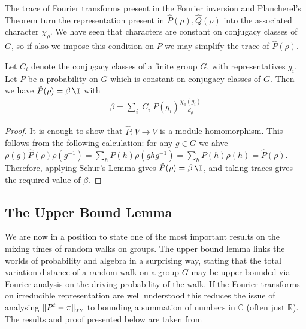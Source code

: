 \documentclass[11pt]{report}
\begin{document}
The trace of Fourier transforms present in the Fourier inversion and Plancherel's Theorem turn the representation present in $\hat{P}(\rho),\hat{Q}(\rho)$ into the associated character 
$\chi_{\rho}$. We have seen that characters are constant on 
conjugacy classes of $G$, so if also we impose this condition on $P$ we may simplify the trace of $\hat{P}(\rho)$. 

\begin{lemma}
	\label{chpt3:lem:trace}
	Let $C_{i}$ denote the conjugacy classes of a finite group $G$, with 
	representatives 
	$g_{i}$. Let $P$ be a probability on $G$ which is constant on conjugacy classes of $G$. 
	Then we have $\hat{P}(\rho) = \beta \, \I$ with
	\begin{eqnarray}
	\beta = \sum_{i} |C_{i}| P(g_{i}) 	\frac{\chi_{\rho}(g_{i})}{d_{\rho}}
	\end{eqnarray} 
\end{lemma}

\begin{proof}
	It is enough to show that 	$\hat{P}:V \to V$ is a module homomorphism. This follows from the following calculation: for any $g \in G$ we ahve
	$\rho(g)\hat{P}(\rho)\rho(g^{-1}) = \sum_{h} P(h) \rho(ghg^{-1})  = \sum_{h} P(h) \rho(h) = \hat{P}(\rho)$. Therefore, applying Schur's Lemma gives $\hat{P}(\rho) = 
	\beta \,\I$, and taking traces gives the required value of $\beta$.
	
	
	
	
	
	
	
	
	
\end{proof}









\subsection{The Upper Bound Lemma}
\label{chpt3:section:upperboundlemma}


We are now in a position to state one of the most important results on the 
mixing times of random walks on groups. The upper bound lemma links the worlds 
of probability and algebra in a surprising way, stating that the total variation distance of a random walk on a group $G$ may be upper bounded via Fourier analysis on
the driving probability of the walk. If the 
Fourier transforms on irreducible representation are well understood this reduces the issue of analysing 
$\lVert P^{t}-\pi \rVert_{\textnormal{\tiny TV}}$ to bounding a summation of numbers in $\mathbb{C}$ (often just $\mathbb{R}$). The results and proof presented below are taken from \cite[Chapter 3B]{Diaconis1988}
\end{document}
